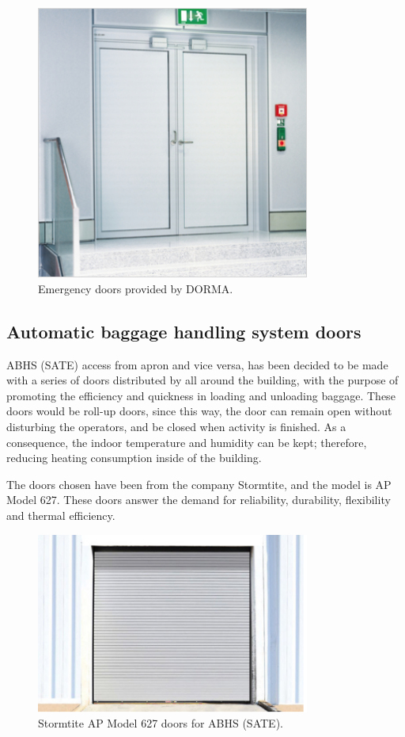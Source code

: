 		\begin{figure}[ht!]
	\centering
\includegraphics[width=9cm]{./images/Facade/emergencydoor}
\caption{Emergency doors provided by DORMA.}
\end{figure}
		\subsection{Automatic baggage handling system doors}
	ABHS (SATE) access from apron and vice versa, has been decided to be made with a series of doors distributed by all around the building, with the purpose of promoting the efficiency and quickness in loading and unloading baggage. These doors would be roll-up doors, since this way, the door can remain open without disturbing the operators, and be closed when activity is finished. As a consequence, the indoor temperature and humidity can be kept; therefore, reducing heating consumption inside of the building.
	
	The doors chosen have been from the company Stormtite, and the model is AP Model 627. These doors answer the demand for reliability, durability, flexibility and thermal efficiency. 
	
			\begin{figure}[ht!]
	\centering
\includegraphics[width=9cm]{./images/Facade/sate}
\caption{Stormtite AP Model 627 doors for ABHS (SATE).}
\end{figure}
	
	

